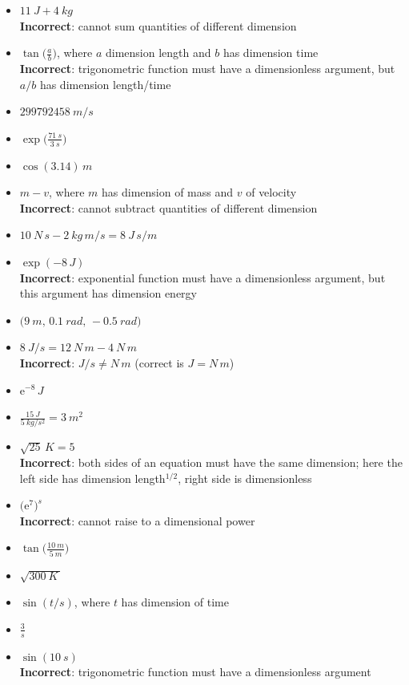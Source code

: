 \documentclass[a4paper,12pt,%
onecolumn,oneside,%
british%
]{memoir}
\newcommand*{\e}{\ensuremath{\mathrm{e}}}
\renewcommand*{\|}[1][]{\nonscript\:#1\vert\nonscript\:\mathopen{}}
\newcommand{\textdim}{\textsf}
\begin{document}
\begin{itemize}[label=$\triangleright$\enskip,itemsep=1ex]
\item $\displaystyle\qty{11}{J} + \qty{4}{kg}$\\%
  \textbf{Incorrect}: cannot sum quantities of different dimension
\item $\displaystyle\tan\biggl(\frac{a}{b}\biggr)$, where $a$ dimension \textdim{length} and $b$ has dimension \textdim{time}\\%
  \textbf{Incorrect}: trigonometric function must have a dimensionless argument, but $a/b$ has dimension \textdim{length}/\textdim{time}
\item $\displaystyle\qty{299792458}{m/s}$
\item $\displaystyle\exp\biggl(\frac{\qty{71}{s}}{\qty{3}{s}}\biggr)$
\item $\displaystyle\cos(\num{3.14})\,\unit{m}$
\item $\displaystyle m - v$, where $m$ has dimension of \textdim{mass} and $v$ of \textdim{velocity}\\%
  \textbf{Incorrect}: cannot subtract quantities of different dimension
\item $\displaystyle \qty{10}{N\, s}-\qty{2}{kg\, m/s} = \qty{8}{J\, s/m}$
\item $\displaystyle\exp(-8\,\unit{J})$\\%
  \textbf{Incorrect}: exponential function must have a dimensionless argument, but this argument has dimension \textdim{energy}
\item $\displaystyle\bigl(\qty{9}{m},\, \qty{0.1}{rad},\, -\qty{0.5}{rad}\bigr)$
\item $\displaystyle\qty{8}{J/s}=\qty{12}{N\,m}-\qty{4}{N\,m}$\\%
  \textbf{Incorrect}: $\unit{J/s} \ne \unit{N\,m}$ (correct is $\unit{J} = \unit{N\,m}$)
\item $\displaystyle\e^{-8}\,\unit{J}$
\item $\displaystyle\frac{\qty{15}{J}}{\qty{5}{kg/s^{2}}} = \qty{3}{m^{2}}$
\item $\displaystyle \sqrt{25}\,\unit{K} = 5$\\%
  \textbf{Incorrect}: both sides of an equation must have the same dimension; here the left side has dimension \textdim{length}${}^{1/2}$, right side is dimensionless
\item $\displaystyle\bigl(\e^{7}\bigr)^{\unit{s}}$\\%
  \textbf{Incorrect}: cannot raise to a dimensional power
\item $\displaystyle\tan\biggl(\frac{\qty{10}{m}}{\qty{5}{m}}\biggr)$
\item $\displaystyle\sqrt{\qty{300}{K}\,}$
\item $\displaystyle\sin(t/\unit{s})$, where $t$ has dimension of \textdim{time}
\item $\displaystyle\frac{3}{\unit{s}}$
\item $\displaystyle\sin(\qty{10}{s})$\\%
  \textbf{Incorrect}: trigonometric function must have a dimensionless argument
\end{itemize}
\end{document}
